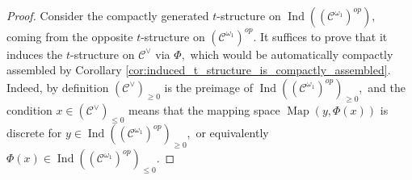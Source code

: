 \documentclass[11pt,leqno]{amsart}
\numberwithin{equation}{section}
\def\Hom{\operatorname{Hom}}
\def\Map{\operatorname{Map}}
\newcommand{\hy}{\mhyphen}
\newcommand{\rex}{\operatorname{rex}}
\newcommand{\ex}{\operatorname{ex}}
\newcommand{\ev}{\mathrm ev}
\newcommand{\cC}{{\mathcal C}}
\newcommand{\Fun}{\operatorname{Fun}}
\newcommand{\Sp}{\operatorname{Sp}}
\newcommand{\Ind}{\operatorname{Ind}}
\begin{document}
\begin{proof}
Consider the compactly generated $t$-structure on $\Ind((\cC^{\omega_1})^{op}),$ coming from the opposite $t$-structure on $(\cC^{\omega_1})^{op}.$ It suffices to prove that  it induces the $t$-structure on $\cC^{\vee}$ via $\Phi,$ which would be automatically compactly assembled by Corollary \ref{cor:induced_t_structure_is_compactly_assembled}. Indeed, by definition $(\cC^{\vee})_{\geq 0}$ is the preimage of $\Ind((\cC^{\omega_1})^{op})_{\geq 0},$ and the condition $x\in(\cC^{\vee})_{\leq 0}$ means that the mapping space $\Map(y,\Phi(x))$ is discrete for $y\in \Ind((\cC^{\omega_1})^{op})_{\geq 0},$ or equivalently $\Phi(x)\in \Ind((\cC^{\omega_1})^{op})_{\leq 0}.$ 



\end{proof}
\end{document}
